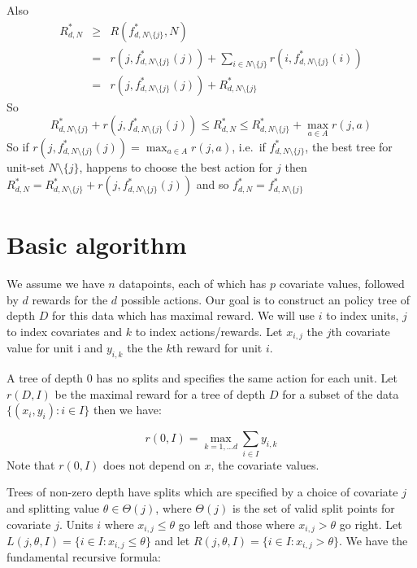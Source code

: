 \documentclass{article}
\newcommand{\splitval}{\ensuremath{\theta}}
\newcommand{\splitvals}{\ensuremath{\Theta}}
\newcommand{\depth}{\ensuremath{D}}
\begin{document}
Also
\begin{eqnarray}
  \label{eq:otherbound}
  R^{*}_{d,N}
  & \geq
  & R(f^{*}_{d,N \setminus \{j\}},N)\\
  & =
  & r(j,f^{*}_{d,N\setminus \{j\}}(j))  + \sum_{i \in N
    \setminus\{j\}} r(i,f^{*}_{d,N\setminus \{j\}}(i)) \\
  & =
  & r(j,f^{*}_{d,N\setminus \{j\}}(j))  +   R^{*}_{d,N
    \setminus \{j\}}
\end{eqnarray}
So
\begin{equation}
  \label{eq:main}
  R^{*}_{d,N \setminus \{j\}}
  + r(j,f^{*}_{d,N\setminus \{j\}}(j))
  \leq
  R^{*}_{d,N}
  \leq
  R^{*}_{d,N \setminus \{j\}} + \max_{a
    \in A} r(j,a)
\end{equation}
So if
$r(j,f^{*}_{d,N\setminus \{j\}}(j)) = \max_{a \in A}
r(j,a)$, i.e.\ if $f^{*}_{d,N\setminus \{j\}}$, the best tree
for unit-set $N\setminus \{j\}$, happens to choose the best action
for $j$ then $R^{*}_{d,N} = R^{*}_{d,N \setminus \{j\}} +
r(j,f^{*}_{d,N\setminus \{j\}}(j))$ and so
$f^{*}_{d,N} = f^{*}_{d,N\setminus \{j\}}$


\section{Basic algorithm}
\label{sec:basics}



We assume we have $n$ datapoints, each of which has $p$ covariate
values, followed by $d$ rewards for the $d$ possible actions. Our goal
is to construct an policy tree of depth $\depth$ for this data which has
maximal reward. We will use $i$ to index units, $j$ to index
covariates and $k$ to index actions/rewards. Let $x_{i,j}$ the $j$th
covariate value for unit i and $y_{i,k}$ the the $k$th reward for unit $i$.

A tree of depth 0 has no splits and specifies the same action for each
unit. Let $r(\depth,I)$ be the maximal reward for a tree of depth
$\depth$ for a subset of the data $\{(x_{i},y_{i}): i \in I\}$ then we
have:

\begin{equation}
  \label{eq:rewardt0}
  r(0,I) = \max_{k=1,\dots d} \sum_{i \in I} y_{i,k}
\end{equation}
Note that $r(0,I)$ does not depend on $x$, the covariate values.

Trees of non-zero depth have splits which are specified by a choice of
covariate $j$ and splitting value $\splitval \in \splitvals(j)$, where
$\splitvals(j)$ is the set of valid split points for covariate
$j$. Units $i$ where $x_{i,j} \leq \splitval$ go left and those where
$x_{i,j} > \splitval$ go right. Let
$L(j,\splitval,I) = \{i \in I :x_{i,j} \leq \splitval\}$ and let
$R(j,\splitval,I) = \{i \in I :x_{i,j} > \splitval\}$. We have the
fundamental recursive formula:
\end{document}
